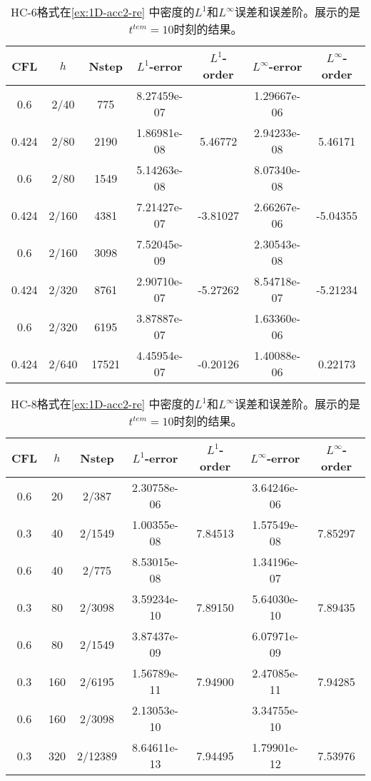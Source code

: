 \def\titleintable{CFL&$h$&Nstep&$L^1$-error&$L^1$-order&$L^\infty$-error&$L^\infty$-order\\}
\begin{table}[htbp]
	\caption{HC-6格式在\cref{ex:1D-acc2-re} 中密度的$L^1$和$L^\infty$误差和误差阶。展示的是$t^{tem} = 10$时刻的结果。}
	\label{ta:1D-ex2-HC6}
	\centering
	\begin{tabular}{ccccccc}
		\toprule
		\titleintable
		\midrule
		0.6   & 2/40  & 775   & 8.27459e-07 &          & 1.29667e-06 &          \\
		0.424 & 2/80  & 2190  & 1.86981e-08 & 5.46772  & 2.94233e-08 & 5.46171  \\
		\midrule
		0.6   & 2/80  & 1549  & 5.14263e-08 &          & 8.07340e-08 &          \\
		0.424 & 2/160 & 4381  & 7.21427e-07 & -3.81027 & 2.66267e-06 & -5.04355 \\
		\midrule
		0.6   & 2/160 & 3098  & 7.52045e-09 &          & 2.30543e-08 &          \\
		0.424 & 2/320 & 8761  & 2.90710e-07 & -5.27262 & 8.54718e-07 & -5.21234 \\
		\midrule
		0.6   & 2/320 & 6195  & 3.87887e-07 &          & 1.63360e-06 &          \\
		0.424 & 2/640 & 17521 & 4.45954e-07 & -0.20126 & 1.40088e-06 & 0.22173  \\
		\bottomrule
	\end{tabular}
\end{table}

\begin{table}[htbp]
	\caption{HC-8格式在\cref{ex:1D-acc2-re} 中密度的$L^1$和$L^\infty$误差和误差阶。展示的是$t^{tem} = 10$时刻的结果。}
	\label{ta:1D-ex2-HC8}
	\centering
	\begin{tabular}{ccccccc}
		\toprule
		\titleintable
		\midrule
		0.6 & 20  & 2/387   & 2.30758e-06 &         & 3.64246e-06 &         \\
		0.3 & 40  & 2/1549  & 1.00355e-08 & 7.84513 & 1.57549e-08 & 7.85297 \\
		\midrule
		0.6 & 40  & 2/775   & 8.53015e-08 &         & 1.34196e-07 &         \\
		0.3 & 80  & 2/3098  & 3.59234e-10 & 7.89150 & 5.64030e-10 & 7.89435 \\
		\midrule
		0.6 & 80  & 2/1549  & 3.87437e-09 &         & 6.07971e-09 &         \\
		0.3 & 160 & 2/6195  & 1.56789e-11 & 7.94900 & 2.47085e-11 & 7.94285 \\
		\midrule
		0.6 & 160 & 2/3098  & 2.13053e-10 &         & 3.34755e-10 &         \\
		0.3 & 320 & 2/12389 & 8.64611e-13 & 7.94495 & 1.79901e-12 & 7.53976 \\
		\bottomrule
	\end{tabular}
\end{table}

